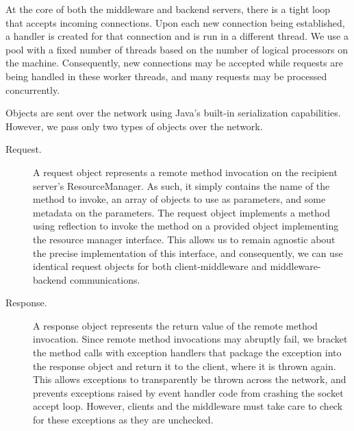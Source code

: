 \documentclass[letterpaper,11pt]{article}
\begin{document}
At the core of both the middleware and backend servers, there is a tight loop
that accepts incoming connections. Upon each new connection being established,
a handler is created for that connection and is run in a different thread. We
use a pool with a fixed number of threads based on the number of logical
processors on the machine. Consequently, new connections may be accepted while
requests are being handled in these worker threads, and many requests may be
processed concurrently.

Objects are sent over the network using Java's built-in serialization
capabilities. However, we pass only two types of objects over the network.

\begin{description}
    \item[Request.] A request object represents a remote method invocation on
        the recipient server's ResourceManager. As such, it simply contains the
        name of the method to invoke, an array of objects to use as parameters,
        and some metadata on the parameters. The request object implements a
        method using reflection to invoke the method on a provided object
        implementing the resource manager interface. This allows us to remain
        agnostic about the precise implementation of this interface, and
        consequently, we can use identical request objects for both
        client-middleware and middleware-backend communications.

    \item[Response.] A response object represents the return value of the
        remote method invocation. Since remote method invocations may abruptly
        fail, we bracket the method calls with exception handlers that
        package the exception into the response object and return it to the
        client, where it is thrown again. This allows exceptions to
        transparently be thrown across the network, and prevents exceptions
        raised by event handler code from crashing the socket accept loop.
        However, clients and the middleware must take care to check for these
        exceptions as they are unchecked.
\end{description}
\end{document}
